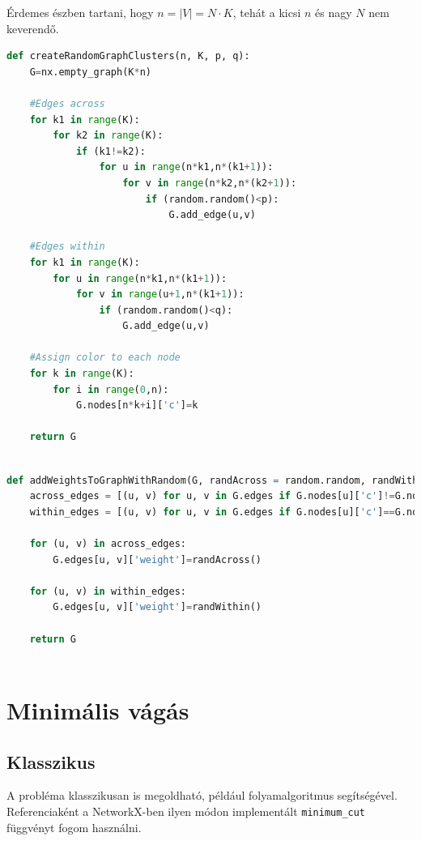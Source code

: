 Érdemes észben tartani, hogy $n=|V|=N \cdot K$, tehát a kicsi $n$ és nagy $N$ nem keverendő.

\begin{lstlisting}[language=python,caption=Gráf generálása,label=code:graphGeneration]	
def createRandomGraphClusters(n, K, p, q):
	G=nx.empty_graph(K*n)
	
	#Edges across
	for k1 in range(K):
		for k2 in range(K):
			if (k1!=k2):
				for u in range(n*k1,n*(k1+1)):
					for v in range(n*k2,n*(k2+1)):
						if (random.random()<p):
							G.add_edge(u,v)
	
	#Edges within
	for k1 in range(K):
		for u in range(n*k1,n*(k1+1)):
			for v in range(u+1,n*(k1+1)):
				if (random.random()<q):
					G.add_edge(u,v)
	
	#Assign color to each node
	for k in range(K):
		for i in range(0,n):
			G.nodes[n*k+i]['c']=k
	
	return G
	
\end{lstlisting}

\begin{lstlisting}[language=python,caption=Súlyok hozzáadása gráfhoz,label=code:graphAddWeights]	
def addWeightsToGraphWithRandom(G, randAcross = random.random, randWithin = random.random):
	across_edges = [(u, v) for u, v in G.edges if G.nodes[u]['c']!=G.nodes[v]['c']]
	within_edges = [(u, v) for u, v in G.edges if G.nodes[u]['c']==G.nodes[v]['c']]
	
	for (u, v) in across_edges:
		G.edges[u, v]['weight']=randAcross()
	
	for (u, v) in within_edges:
		G.edges[u, v]['weight']=randWithin()
		
	return G
	
\end{lstlisting}

\section{Minimális vágás}


\subsection{Klasszikus}

A probléma klasszikusan is megoldható, például folyamalgoritmus segítségével. Referenciaként a NetworkX-ben ilyen módon implementált \verb+minimum_cut+ függvényt fogom használni.

